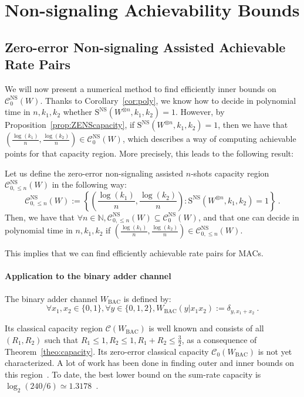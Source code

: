 \section{Non-signaling Achievability Bounds}
\label{section:IB}
\subsection{Zero-error Non-signaling Assisted Achievable Rate Pairs}
We will now present a numerical method to find efficiently inner bounds on $\mathcal{C}_0^{\mathrm{NS}}(W)$. Thanks to Corollary~\ref{cor:poly}, we know how to decide in polynomial time in $n,k_1,k_2$ whether $\mathrm{S}^{\mathrm{NS}}(W^{\otimes n},k_1,k_2)=1$. However, by Proposition~\ref{prop:ZENScapacity}, if $\mathrm{S}^{\mathrm{NS}}(W^{\otimes n},k_1,k_2)=1$, then we have that $\left(\frac{\log(k_1)}{n},\frac{\log(k_2)}{n}\right) \in \mathcal{C}_0^{\mathrm{NS}}(W)$, which describes a way of computing achievable points for that capacity region. More precisely, this leads to the following result:

\begin{proposition}
  \label{prop:IB}
  Let us define the zero-error non-signaling assisted $n$-shots capacity region $\mathcal{C}_{0,\leq n}^{\mathrm{NS}}(W)$ in the following way:
  \[ \mathcal{C}_{0,\leq n}^{\mathrm{NS}}(W)  := \left\{ \left(\frac{\log(k_1)}{n},\frac{\log(k_2)}{n}\right) : \mathrm{S}^{\mathrm{NS}}(W^{\otimes n},k_1,k_2)=1 \right\}\ . \]
  Then, we have that $\forall n \in \mathbb{N}, \mathcal{C}_{0,\leq n}^{\mathrm{NS}}(W) \subseteq \mathcal{C}_0^{\mathrm{NS}}(W)$, and that one can decide in polynomial time in $n,k_1,k_2$ if $\left(\frac{\log(k_1)}{n},\frac{\log(k_2)}{n}\right) \in \mathcal{C}_{0,\leq n}^{\mathrm{NS}}(W)$.
\end{proposition}

This implies that we can find efficiently achievable rate pairs for MACs.

\paragraph{Application to the binary adder channel}
The binary adder channel $W_{\text{BAC}}$ is defined by:
\[ \forall x_1,x_2 \in \{0,1\}, \forall y \in \{0,1,2\}, W_{\text{BAC}}(y|x_1x_2) := \delta_{y,x_1+x_2} \ .\]

Its classical capacity region $\mathcal{C}(W_{\text{BAC}})$ is well known and consists of all $(R_1,R_2)$ such that $R_1 \leq 1,R_2 \leq 1, R_1+R_2 \leq \frac{3}{2}$, as a consequence of Theorem~\ref{theo:capacity}. Its zero-error classical capacity $\mathcal{C}_0(W_{\text{BAC}})$ is not yet characterized. A lot of work has been done in finding outer and inner bounds on this region~\cite{Lindstrom69,Tilborg78,KL78,Weldon78,KLWY83,BT85,BB98,UL98,AB99,MO05,OS15}. To date, the best lower bound on the sum-rate capacity is $\log_2(240/6) \simeq 1.3178$~\cite{MO05}.

